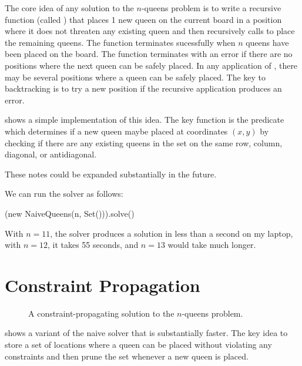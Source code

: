 The core idea of any solution to the $n$-queens problem is to write a recursive
function (called ) that places 1 new queen on the current
board in a position where it does not threaten any existing queen and then
recursively calls  to place the remaining queens. The
function terminates sucessfully when $n$ queens have been placed on the board.
The function terminates with an error if there are no positions where the next
queen can be safely placed. In any application of , there may
be several positions where a queen can be safely placed. The key to backtracking
is to try a new position if the recursive application produces an error.

 shows a simple implementation of this idea. The key function
is the  predicate which determines if a new queen
maybe placed at coordinates $(x,y)$ by checking if there are any existing
queens in the set  on the same row, column, diagonal,
or antidiagonal.

\begin{instructor}
These notes could be expanded substantially in the future.
\end{instructor}

We can run the solver as follows:

\begin{scalacode}
(new NaiveQueens(n, Set())).solve()
\end{scalacode}
With $n = 11$, the solver produces a solution in less than a second on my
laptop, with $n = 12$, it takes 55 seconds, and $n = 13$ would take much longer.

\section{Constraint Propagation}

\begin{figure}
\caption{A constraint-propagating solution to the $n$-queens problem.}
\label{OptQueens}
\end{figure}

 shows a variant of the naive solver that is substantially
faster. The key idea to store a set of locations where a queen can be placed
without violating any constraints and then prune the set whenever a new queen
is placed.
